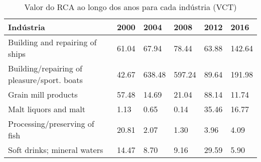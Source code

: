 \begin{table}
\centering
\caption{Valor do RCA ao longo dos anos para cada indústria (VCT)}
\label{tab:ex3-tempo-VCT}
\begin{tabular}{p{6cm}p{1.5cm}p{1.5cm}p{1.5cm}p{1.5cm}p{1.5cm}}
\toprule
                                  Indústria &  2000 &   2004 &   2008 &  2012 &   2016 \\
\midrule
            Building and repairing of ships & 61.04 &  67.94 &  78.44 & 63.88 & 142.64 \\
Building/repairing of pleasure/sport. boats & 42.67 & 638.48 & 597.24 & 89.64 & 191.98 \\
                        Grain mill products & 57.48 &  14.69 &  21.04 & 88.14 &  11.74 \\
                      Malt liquors and malt &  1.13 &   0.65 &   0.14 & 35.46 &  16.77 \\
              Processing/preserving of fish & 20.81 &   2.07 &   1.30 &  3.96 &   4.09 \\
                Soft drinks; mineral waters & 14.47 &   8.70 &   9.16 & 29.59 &   5.90 \\
\bottomrule
\end{tabular}
\end{table}
